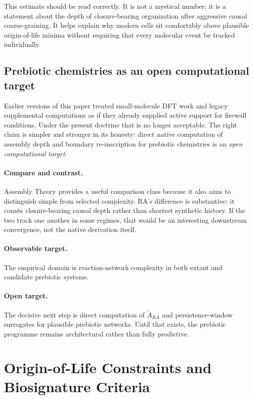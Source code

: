 \documentclass[11pt]{article}
\def\mathrm#1{#1}%
\begin{document}
This estimate should be read correctly. It is not a mystical number; it is a statement about the depth of closure-bearing organization after aggressive causal coarse-graining. It helps explain why modern cells sit comfortably above plausible origin-of-life minima without requiring that every molecular event be tracked individually.

\subsection{Prebiotic chemistries as an open computational target}

Earlier versions of this paper treated small-molecule DFT work and legacy supplemental computations as if they already supplied active support for firewall conditions. Under the present doctrine that is no longer acceptable. The right claim is simpler and stronger in its honesty: direct native computation of assembly depth and boundary re-inscription for prebiotic chemistries is an \emph{open computational target}.

\paragraph{Compare and contrast.} Assembly Theory \cite{Sharma2023} provides a useful comparison class because it also aims to distinguish simple from selected complexity. RA's difference is substantive: it counts closure-bearing causal depth rather than shortest synthetic history. If the two track one another in some regimes, that would be an interesting downstream convergence, not the native derivation itself.

\paragraph{Observable target.} The empirical domain is reaction-network complexity in both extant and candidate prebiotic systems.

\paragraph{Open target.} The decisive next step is direct computation of $\tilde{A}_{\mathrm{RA}}$ and persistence-window surrogates for plausible prebiotic networks. Until that exists, the prebiotic programme remains architectural rather than fully predictive.

\section{Origin-of-Life Constraints and Biosignature Criteria}
\label{sec:origin}
\end{document}
